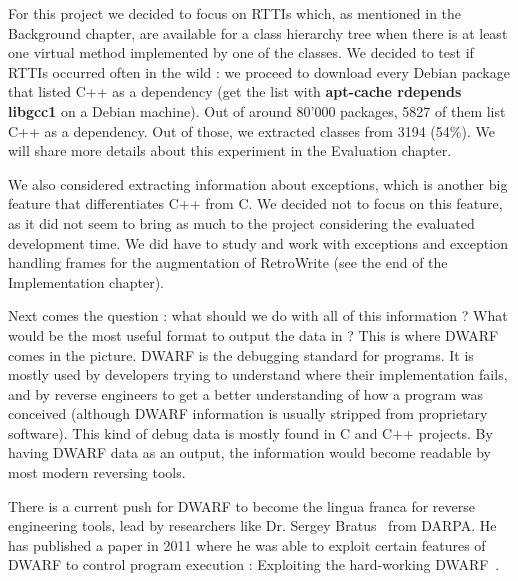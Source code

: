 \documentclass[a4paper,11pt,oneside]{report}
\begin{document}
For this project we decided to focus on RTTIs which, as mentioned in the Background chapter, are available for a class hierarchy tree when there is at least one virtual method implemented by one of the classes.
We decided to test if RTTIs occurred often in the wild : we proceed to download every Debian package that listed C++ as a dependency (get the list with \textbf{apt-cache rdepends libgcc1} on a Debian machine).
Out of around 80'000 packages, 5827 of them list C++ as a dependency.
Out of those, we extracted classes from 3194 (54\%).
We will share more details about this experiment in the Evaluation chapter.

We also considered extracting information about exceptions, which is another big feature that differentiates C++ from C.
We decided not to focus on this feature, as it did not seem to bring as much to the project considering the evaluated development time.
We did have to study and work with exceptions and exception handling frames for the augmentation of RetroWrite (see the end of the Implementation chapter).

Next comes the question : what should we do with all of this information ? What would be the most useful format to output the data in ?
This is where DWARF~\cite{dwarf} comes in the picture. DWARF is the debugging standard for programs.
It is mostly used by developers trying to understand where their implementation fails,
and by reverse engineers to get a better understanding of how a program was conceived (although DWARF information is usually stripped from proprietary software).
This kind of debug data is mostly found in C and C++ projects. %
By having DWARF data as an output, the information would become readable by most modern reversing tools.

There is a current push for DWARF to become the lingua franca for reverse engineering tools, lead by researchers like Dr. Sergey Bratus~\cite{bratus} from DARPA.
He has published a paper in 2011 where he was able to exploit certain features of DWARF to control program execution : Exploiting the hard-working DWARF~\cite{hardworkingdwarf}.
\end{document}
